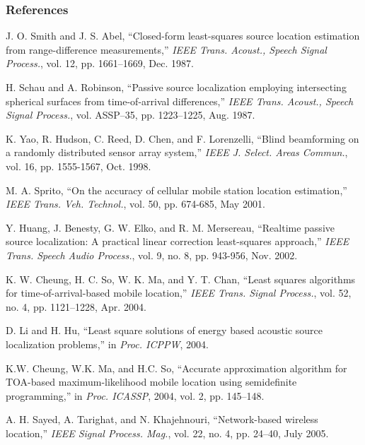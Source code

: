 

\begin{frame} [t,allowframebreaks]
\frametitle{References}

%

\begin{thebibliography}{99} 

J. O. Smith and J. S. Abel, ``Closed-form least-squares source location
estimation from range-difference measurements,'' {\em IEEE Trans. Acoust.,
Speech Signal Process.}, vol. 12, pp. 1661--1669, Dec. 1987.

H. Schau and A. Robinson, ``Passive source localization employing intersecting spherical surfaces from time-of-arrival differences,'' {\em IEEE Trans. Acoust., Speech Signal Process.}, vol. ASSP--35, pp. 1223--1225, Aug. 1987.

K. Yao, R. Hudson, C. Reed, D. Chen, and F. Lorenzelli, ``Blind beamforming on a randomly distributed sensor array system,'' {\em IEEE J. Select. Areas Commun.}, vol. 16, pp. 1555-1567, Oct. 1998.

M. A. Sprito, ``On the accuracy of cellular mobile station location estimation,'' {\em IEEE Trans. Veh. Technol.}, vol. 50, pp. 674-685, May 2001.

Y. Huang, J. Benesty, G. W. Elko, and R. M. Mersereau, ``Realtime passive source localization: A practical linear correction least-squares approach,'' {\em IEEE Trans. Speech Audio Process.}, vol. 9, no. 8, pp. 943-956, Nov. 2002.

K. W. Cheung, H. C. So, W. K. Ma, and Y. T. Chan, ``Least squares algorithms for time-of-arrival-based mobile location,'' {\em IEEE Trans. Signal Process.}, vol. 52, no. 4, pp. 1121--1228, Apr. 2004.

D. Li and H. Hu, ``Least square solutions of energy based acoustic source localization problems,'' in {\em Proc. ICPPW}, 2004.

K.W. Cheung, W.K. Ma, and H.C. So, ``Accurate approximation algorithm for TOA-based maximum-likelihood mobile location using semidefinite programming,'' in {\em Proc. ICASSP}, 2004, vol. 2, pp. 145--148.

A. H. Sayed, A. Tarighat, and N. Khajehnouri, ``Network-based wireless location,'' {\em IEEE Signal Process. Mag.}, vol. 22, no. 4, pp. 24--40, July 2005.


\end{thebibliography}
\end{frame}
